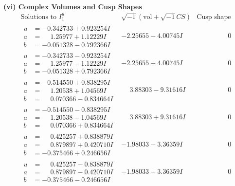 \documentclass[1p]{elsarticle_modified}
\theoremstyle{definition}
\newcommand{\I}{\sqrt{-1}}
\begin{document}
\newpage\flushleft \textbf{(vi) Complex Volumes and Cusp Shapes}
$$\begin{array}{c|c|c}  
\text{Solutions to }I^u_{1}& \I (\text{vol} + \sqrt{-1}CS) & \text{Cusp shape}\\
 \hline 
\begin{aligned}
u &= -0.342733 + 0.923254 I \\
a &= \phantom{-}1.25977 + 1.12229 I \\
b &= -0.051328 - 0.792366 I\end{aligned}
 & -2.25655 - 4.00745 I & \phantom{-0.000000 } 0 \\ \hline\begin{aligned}
u &= -0.342733 - 0.923254 I \\
a &= \phantom{-}1.25977 - 1.12229 I \\
b &= -0.051328 + 0.792366 I\end{aligned}
 & -2.25655 + 4.00745 I & \phantom{-0.000000 } 0 \\ \hline\begin{aligned}
u &= -0.514550 + 0.838295 I \\
a &= \phantom{-}1.20538 + 1.04569 I \\
b &= \phantom{-}0.070366 - 0.834664 I\end{aligned}
 & \phantom{-}3.88303 - 9.31616 I & \phantom{-0.000000 } 0 \\ \hline\begin{aligned}
u &= -0.514550 - 0.838295 I \\
a &= \phantom{-}1.20538 - 1.04569 I \\
b &= \phantom{-}0.070366 + 0.834664 I\end{aligned}
 & \phantom{-}3.88303 + 9.31616 I & \phantom{-0.000000 } 0 \\ \hline\begin{aligned}
u &= \phantom{-}0.425257 + 0.838879 I \\
a &= \phantom{-}0.879897 + 0.420710 I \\
b &= -0.375466 + 0.246656 I\end{aligned}
 & -1.98033 - 3.36359 I & \phantom{-0.000000 } 0 \\ \hline\begin{aligned}
u &= \phantom{-}0.425257 - 0.838879 I \\
a &= \phantom{-}0.879897 - 0.420710 I \\
b &= -0.375466 - 0.246656 I\end{aligned}
 & -1.98033 + 3.36359 I & \phantom{-0.000000 } 0 \\ \hline\begin{aligned}

\end{aligned}
\end{array}$$
\end{document}
